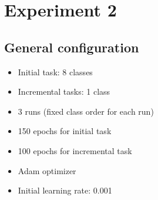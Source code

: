 \documentclass[11pt]{article}
\title{}
\author{}
\date{\today}
\begin{document}

\makeatletter
\setlength{\@fptop}{0pt}
\makeatother



\section{Experiment 2}

\subsection{General configuration}

\begin{itemize}

\item Initial task: 8 classes
\item Incremental tasks: 1 class
\item 3 runs (fixed class order for each run)
\item 150 epochs for initial task
\item 100 epochs for incremental task
\item Adam optimizer
\item Initial learning rate: 0.001

\end{itemize}

%
\end{document}
